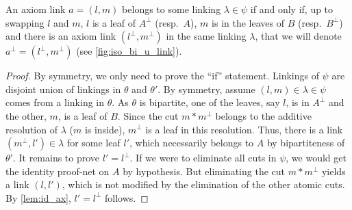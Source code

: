 \documentclass{lmcs}
\newcommand*{\orth}{^\perp} %
\newcommand*{\resp}{resp.}
\begin{document}
\begin{lem}
\label{lem:iso_bi_u_link}
An axiom link $a=(l,m)$ belongs to some linking $\lambda\in\psi$ if and only if, up to swapping $l$ and $m$, $l$ is a leaf of $A\orth$ (\resp\ $A$), $m$ is in the leaves of $B$ (\resp\ $B\orth$) and there is an axiom link $(l\orth,m\orth)$ in the same linking $\lambda$, that we will denote $a\orth=(l\orth,m\orth)$ (see \autoref{fig:iso_bi_u_link}).
\end{lem}
\begin{proof}
By symmetry, we only need to prove the ``if'' statement.
Linkings of $\psi$ are disjoint union of linkings in $\theta$ and $\theta'$.
By symmetry, assume $(l,m)\in\lambda\in\psi$ comes from a linking in $\theta$.
As $\theta$ is bipartite, one of the leaves, say $l$, is in $A\orth$ and the other, $m$, is a leaf of $B$.
Since the cut $m\ast m\orth$ belongs to the additive resolution of $\lambda$ ($m$ is inside), $m\orth$ is a leaf in this resolution. Thus, there is a link $(m\orth,l')\in\lambda$ for some leaf $l'$, which necessarily belongs to $A$ by bipartiteness of $\theta'$.
It remains to prove $l'=l\orth$.
If we were to eliminate all cuts in $\psi$, we would get the identity proof-net on $A$ by hypothesis.
But eliminating the cut $m\ast m\orth$ yields a link $(l,l')$, which is not modified by the elimination of the other atomic cuts.
By \autoref{lem:id_ax}, $l'=l\orth$ follows.
\end{proof}
\end{document}
